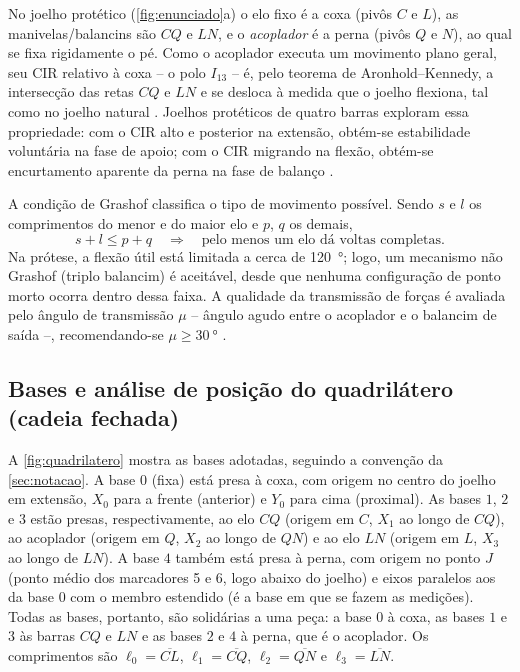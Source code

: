 \documentclass[12pt,a4paper,twoside]{article}
\numberwithin{equation}{section}
\begin{document}
No joelho protético (\cref{fig:enunciado}a) o elo fixo é a coxa (pivôs $C$ e $L$),
as manivelas/balancins são $CQ$ e $LN$, e o \emph{acoplador} é a perna (pivôs $Q$ e $N$),
ao qual se fixa rigidamente o pé. Como o acoplador executa um movimento plano geral,
seu CIR relativo à coxa -- o polo $I_{13}$ -- é, pelo teorema de Aronhold--Kennedy, a
intersecção das retas $CQ$ e $LN$ e se desloca à medida que o joelho flexiona, tal como
no joelho natural \cite{norton2010,radcliffe1994}. Joelhos protéticos de quatro barras
exploram essa propriedade: com o CIR alto e posterior na extensão, obtém-se
estabilidade voluntária na fase de apoio; com o CIR migrando na flexão, obtém-se
encurtamento aparente da perna na fase de balanço \cite{radcliffe1994}.

A condição de Grashof classifica o tipo de movimento possível. Sendo $s$ e $l$ os
comprimentos do menor e do maior elo e $p$, $q$ os demais,
\begin{equation}
  s + l \le p + q \quad\Longrightarrow\quad \text{pelo menos um elo dá voltas completas.}
  \label{eq:grashof}
\end{equation}
Na prótese, a flexão útil está limitada a cerca de \SI{120}{\degree}; logo, um mecanismo
não Grashof (triplo balancim) é aceitável, desde que nenhuma configuração de ponto
morto ocorra dentro dessa faixa. A qualidade da transmissão de forças é avaliada pelo
ângulo de transmissão $\mu$ -- ângulo agudo entre o acoplador e o balancim de saída --,
recomendando-se $\mu \ge \SI{30}{\degree}$ \cite{norton2010}.

\subsection{Bases e análise de posição do quadrilátero (cadeia fechada)}\label{sec:cadeia_fechada}

A \cref{fig:quadrilatero} mostra as bases adotadas, seguindo a convenção da
\cref{sec:notacao}. A base $0$ (fixa) está presa à coxa, com origem no centro do joelho em
extensão, $X_0$ para a frente (anterior) e $Y_0$ para cima (proximal). As bases $1$, $2$ e $3$
estão presas, respectivamente, ao elo $CQ$ (origem em $C$, $X_1$ ao longo de $CQ$), ao
acoplador (origem em $Q$, $X_2$ ao longo de $QN$) e ao elo $LN$ (origem em $L$, $X_3$ ao longo
de $LN$). A base $4$ também está presa à perna, com origem no ponto $J$ (ponto médio dos
marcadores 5 e 6, logo abaixo do joelho) e eixos paralelos aos da base $0$ com o membro
estendido (é a base em que se fazem as medições). Todas as bases, portanto, são solidárias a
uma peça: a base $0$ à coxa, as bases $1$ e $3$ às barras $CQ$ e $LN$ e as bases $2$ e $4$ à
perna, que é o acoplador. Os
comprimentos são $\ell_0 = \overline{CL}$, $\ell_1 = \overline{CQ}$, $\ell_2 = \overline{QN}$ e
$\ell_3 = \overline{LN}$.
\end{document}
